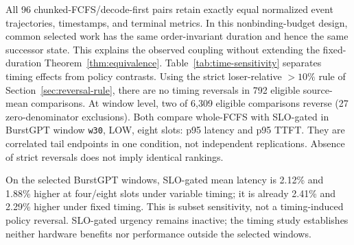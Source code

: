 All 96 chunked-FCFS/decode-first pairs retain exactly equal normalized event
trajectories, timestamps, and terminal metrics. In this nonbinding-budget
design, common selected work has the same order-invariant duration and
hence the same successor state. This explains the observed coupling
without extending the fixed-duration Theorem~\ref{thm:equivalence}.
Table~\ref{tab:time-sensitivity} separates timing effects from policy contrasts.
Using the strict loser-relative $>10\%$ rule of Section~\ref{sec:reversal-rule},
there are no timing reversals in 792 eligible source-mean comparisons.
At window level, two of 6,309 eligible comparisons reverse (27 zero-denominator
exclusions). Both compare whole-FCFS with SLO-gated in BurstGPT window
\texttt{w30}, LOW, eight slots: p95 latency and p95 TTFT. They are correlated
tail endpoints in one condition, not independent replications. Absence of
strict reversals does not imply identical rankings.



On the selected BurstGPT windows, SLO-gated mean latency is 2.12\% and
1.88\% higher at four/eight slots under variable timing; it is already
2.41\% and 2.29\% higher under fixed timing. This is subset sensitivity,
not a timing-induced policy reversal. SLO-gated urgency remains inactive;
the timing study establishes neither hardware benefits nor performance
outside the selected windows.
